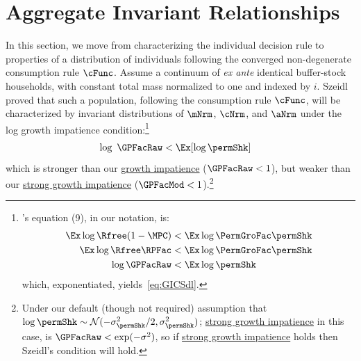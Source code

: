 \documentclass[\econtexRoot/BufferStockTheory]{subfiles}
\begin{document}
\hypertarget{The-Aggregate-and-Idiosyncratic-Relationship-Between-Consumption-Growth-and-Income-Growth}{}
\section{Aggregate Invariant Relationships}
In this section, we move from characterizing the individual decision rule to properties of a distribution of individuals following the converged non-degenerate consumption rule $\cFunc$.
Assume a continuum of \textit{ex ante} identical buffer-stock households, with constant total mass normalized to one and indexed by $i$.
Szeidl~\citeyearpar{szeidlInvariant} proved that such a population, following the consumption rule $\cFunc$, will be characterized by invariant distributions of $\mNrm$, $\cNrm$, and $\aNrm$ under the log growth impatience condition:\footnote{\cite{szeidlInvariant}'s equation (9), in our notation, is:
  \begin{equation}\begin{gathered}\begin{aligned}
    \Ex \log \Rfree (1-\MPC) & < \Ex \log \PermGroFac \permShk
    \\  \Ex \log \Rfree \RPFac  &  < \Ex \log \PermGroFac \permShk
    \\ \log \GPFacRaw & < \Ex \log \permShk
  \end{aligned}\end{gathered}\end{equation}
  which, exponentiated, yields~\eqref{eq:GICSdl}.}
\hypertarget{GICSdl}{}
\begin{equation}\begin{gathered}\begin{aligned}
   \log~\GPFacRaw & < \Ex [\log \permShk] \label{eq:GICSdl}
\end{aligned}\end{gathered}\end{equation}
which is stronger than our \hyperlink{GICRaw}{growth impatience} ($\GPFacRaw < 1$), but weaker than our \hyperlink{GICMod}{strong growth impatience}  ($\GPFacMod < 1$).\footnote{Under our default (though not required) assumption that $\log \permShk \sim \mathcal{N}(-\sigma^{2}_{\permShk}/2,\sigma^{2}_{\permShk})$; \hyperlink{GICMod}{strong growth impatience} in this case, is $\GPFacRaw < \exp(-\sigma^{2})$, so if \hyperlink{GICMod}{strong growth impatience} holds then Szeidl's condition will hold.}

\hypertarget{Growth-Rates-of-Aggregate-Income-and-Consumption}{}
\end{document}
